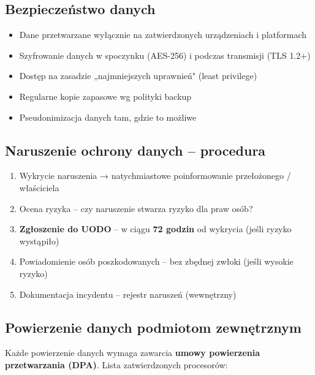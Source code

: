 \documentclass[12pt,a4paper]{article}
\providecommand{\tightlist}{\setlength{\itemsep}{0pt}\setlength{\parskip}{0pt}}
\begin{document}
\subsection{Bezpieczeństwo danych}\label{bezpieczeux144stwo-danych}

\begin{itemize}
\tightlist
\item
  Dane przetwarzane wyłącznie na zatwierdzonych urządzeniach i
  platformach
\item
  Szyfrowanie danych w spoczynku (AES-256) i podczas transmisji (TLS
  1.2+)
\item
  Dostęp na zasadzie „najmniejszych uprawnień" (least privilege)
\item
  Regularne kopie zapasowe wg polityki backup
\item
  Pseudonimizacja danych tam, gdzie to możliwe
\end{itemize}

\subsection{Naruszenie ochrony danych --
procedura}\label{naruszenie-ochrony-danych-procedura}

\begin{enumerate}
\tightlist
\item
  Wykrycie naruszenia → natychmiastowe poinformowanie przełożonego /
  właściciela
\item
  Ocena ryzyka -- czy naruszenie stwarza ryzyko dla praw osób?
\item
  \textbf{Zgłoszenie do UODO} -- w ciągu \textbf{72 godzin} od wykrycia
  (jeśli ryzyko wystąpiło)
\item
  Powiadomienie osób poszkodowanych -- bez zbędnej zwłoki (jeśli wysokie
  ryzyko)
\item
  Dokumentacja incydentu -- rejestr naruszeń (wewnętrzny)
\end{enumerate}

\subsection{Powierzenie danych podmiotom
zewnętrznym}\label{powierzenie-danych-podmiotom-zewnux119trznym}

Każde powierzenie danych wymaga zawarcia \textbf{umowy powierzenia
przetwarzania (DPA)}. Lista zatwierdzonych procesorów:
\end{document}

